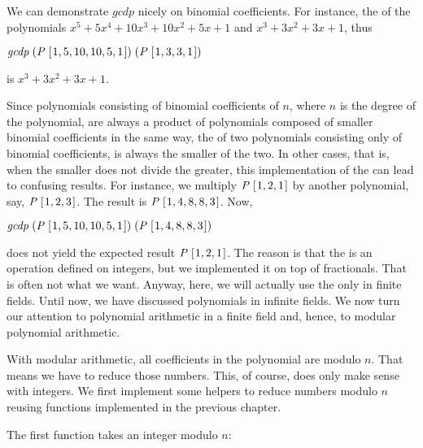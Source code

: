 \documentclass[tikz]{scrreprt}
\newcommand{\Conid}[1]{\mathit{#1}}
\newcommand{\Varid}[1]{\mathit{#1}}
\begin{document}
We can demonstrate \ensuremath{\Varid{gcdp}} nicely on binomial coefficients.
For instance, the  of the polynomials
$x^5 + 5x^4 + 10x^3 + 10x^2 + 5x + 1$ and
$x^3 + 3x^2 + 3x + 1$, thus

\ensuremath{\Varid{gcdp}\;(\Conid{P}\;[\mskip1.5mu \mathrm{1},\mathrm{5},\mathrm{10},\mathrm{10},\mathrm{5},\mathrm{1}\mskip1.5mu])\;(\Conid{P}\;[\mskip1.5mu \mathrm{1},\mathrm{3},\mathrm{3},\mathrm{1}\mskip1.5mu])}

is $x^3 + 3x^2 + 3x + 1$.

Since polynomials consisting of binomial coefficients of $n$,
where $n$ is the degree of the polynomial,
are always a product
of polynomials composed of smaller binomial coefficients
in the same way,
the  of two polynomials
consisting only of binomial coefficients,
is always the smaller of the two.
In other cases, that is, when the smaller does not divide
the greater, this implementation of the 
can lead to confusing results. For instance,
we multiply \ensuremath{\Conid{P}\;[\mskip1.5mu \mathrm{1},\mathrm{2},\mathrm{1}\mskip1.5mu]} by another polynomial, say,
\ensuremath{\Conid{P}\;[\mskip1.5mu \mathrm{1},\mathrm{2},\mathrm{3}\mskip1.5mu]}. The result is \ensuremath{\Conid{P}\;[\mskip1.5mu \mathrm{1},\mathrm{4},\mathrm{8},\mathrm{8},\mathrm{3}\mskip1.5mu]}. Now,

\ensuremath{\Varid{gcdp}\;(\Conid{P}\;[\mskip1.5mu \mathrm{1},\mathrm{5},\mathrm{10},\mathrm{10},\mathrm{5},\mathrm{1}\mskip1.5mu])\;(\Conid{P}\;[\mskip1.5mu \mathrm{1},\mathrm{4},\mathrm{8},\mathrm{8},\mathrm{3}\mskip1.5mu])}

does not yield the expected result \ensuremath{\Conid{P}\;[\mskip1.5mu \mathrm{1},\mathrm{2},\mathrm{1}\mskip1.5mu]}.
The reason is that the  is an operation
defined on integers, but we implemented it on top
of fractionals. That is often not what we want.
Anyway, here, we will actually use the  
only in finite fields. 
Until now, we have discussed polynomials in infinite fields.
We now turn our attention to polynomial arithmetic
in a finite field and, hence, to modular polynomial arithmetic.

With modular arithmetic, all coefficients in the polynomial
are modulo $n$. That means we have to reduce those numbers.
This, of course, does only make sense with integers.
We first implement some helpers to reduce numbers modulo $n$
reusing functions implemented in the previous chapter.

The first function takes an integer modulo $n$:
\end{document}
